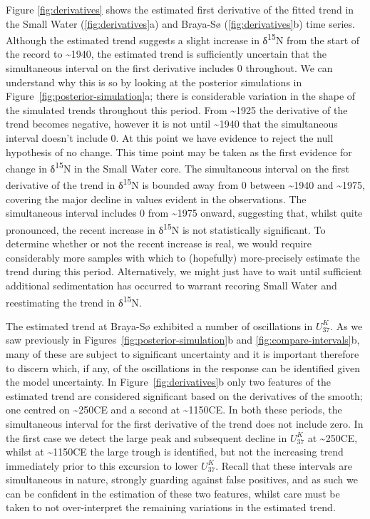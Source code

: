 \documentclass[12pt,]{article}
\newcommand{\uk}{\ensuremath{\mathit{U}^{\mathit{K}}_{\mathup{37}}}}
\begin{document}
Figure \ref{fig:derivatives} shows the estimated first derivative of the
fitted trend in the Small Water (\ref{fig:derivatives}a) and Braya-Sø
(\ref{fig:derivatives}b) time series. Although the estimated trend
suggests a slight increase in δ\textsuperscript{15}N from the start of
the record to \textasciitilde{}1940, the estimated trend is sufficiently
uncertain that the simultaneous interval on the first derivative
includes 0 throughout. We can understand why this is so by looking at
the posterior simulations in Figure~\ref{fig:posterior-simulation}a;
there is considerable variation in the shape of the simulated trends
throughout this period. From \textasciitilde{}1925 the derivative of the
trend becomes negative, however it is not until \textasciitilde{}1940
that the simultaneous interval doesn't include \(0\). At this point we
have evidence to reject the null hypothesis of no change. This time
point may be taken as the first evidence for change in
δ\textsuperscript{15}N in the Small Water core. The simultaneous
interval on the first derivative of the trend in δ\textsuperscript{15}N
is bounded away from \(0\) between \textasciitilde{}1940 and
\textasciitilde{}1975, covering the major decline in values evident in
the observations. The simultaneous interval includes \(0\) from
\textasciitilde{}1975 onward, suggesting that, whilst quite pronounced,
the recent increase in δ\textsuperscript{15}N is not statistically
significant. To determine whether or not the recent increase is real, we
would require considerably more samples with which to (hopefully)
more-precisely estimate the trend during this period. Alternatively, we
might just have to wait until sufficient additional sedimentation has
occurred to warrant recoring Small Water and reestimating the trend in
δ\textsuperscript{15}N.

The estimated trend at Braya-Sø exhibited a number of oscillations in
\uk{}. As we saw previously in Figures~\ref{fig:posterior-simulation}b
and \ref{fig:compare-intervals}b, many of these are subject to
significant uncertainty and it is important therefore to discern which,
if any, of the oscillations in the response can be identified given the
model uncertainty. In Figure~\ref{fig:derivatives}b only two features of
the estimated trend are considered significant based on the derivatives
of the smooth; one centred on \textasciitilde{}250CE and a second at
\textasciitilde{}1150CE. In both these periods, the simultaneous
interval for the first derivative of the trend does not include zero. In
the first case we detect the large peak and subsequent decline in \uk{}
at \textasciitilde{}250CE, whilst at \textasciitilde{}1150CE the large
trough is identified, but not the increasing trend immediately prior to
this excursion to lower \uk. Recall that these intervals are
simultaneous in nature, strongly guarding against false positives, and
as such we can be confident in the estimation of these two features,
whilst care must be taken to not over-interpret the remaining variations
in the estimated trend.
\end{document}
